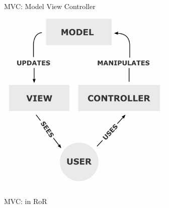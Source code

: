 \documentclass[12pt]{beamer}
\begin{document}

\begin{frame}
	\begin{figure}{MVC: Model View Controller}
		\includegraphics[scale=0.50]{MVC-Process.png}
	\end{figure}
\end{frame}

\begin{frame}[fragile]
	\begin{figure}{MVC: in RoR}
	\end{figure}
\end{frame}
\end{document}

